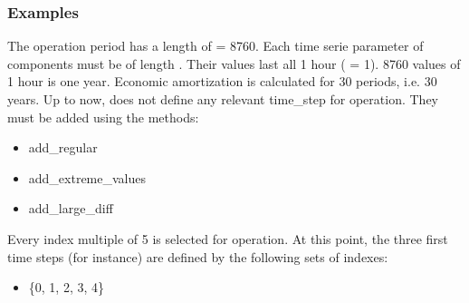 \documentclass[letterpaper,10pt,english]{sphinxmanual}
\begin{document}
\begin{fulllineitems}
\begin{fulllineitems}
\begin{quote}
\begin{description}
\begin{itemize}
\end{itemize}

\end{description}\end{quote}
\subsubsection*{Examples}

\begin{sphinxVerbatim}[commandchars=\\\{\}]
    
\end{sphinxVerbatim}

\sphinxAtStartPar
The operation period has a length of  = 8760.
Each time serie parameter of components must be of length . Their values last all 1 hour ( = 1).
8760 values of 1 hour is one year.
Economic amortization is calculated for 30 periods, i.e. 30 years.
Up to now,  does not define any relevant time\_step for operation. They must be added using the methods:
\begin{itemize}
\item {} 
\sphinxAtStartPar
add\_regular

\item {} 
\sphinxAtStartPar
add\_extreme\_values

\item {} 
\sphinxAtStartPar
add\_large\_diff

\end{itemize}

\begin{sphinxVerbatim}[commandchars=\\\{\}]
\end{sphinxVerbatim}

\sphinxAtStartPar
Every index multiple of 5 is selected for operation.
At this point, the three first time steps (for instance) are defined by the following sets of indexes:
\begin{itemize}
\item {} 
\sphinxAtStartPar
\{0, 1, 2, 3, 4\}


\end{itemize}
\end{fulllineitems}
\end{fulllineitems}
\end{document}
